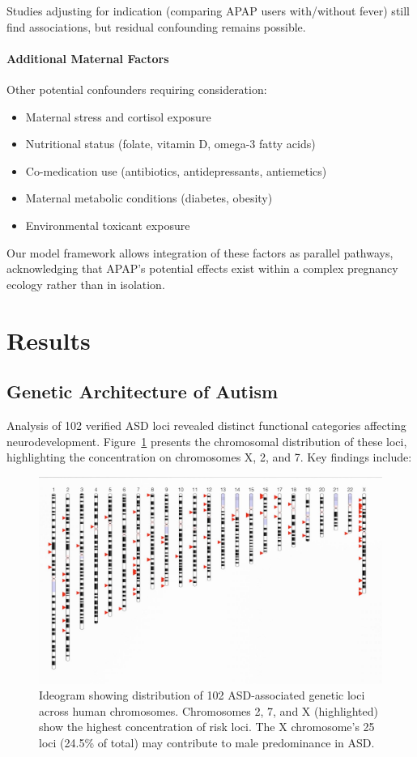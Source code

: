 \documentclass[11pt]{article}
\let\oldsection\section
\renewcommand{\section}[1]{\oldsection{#1}\setlength{\leftskip}{0em}}
\let\oldsubsection\subsection
\renewcommand{\subsection}[1]{\oldsubsection{#1}\setlength{\leftskip}{0.75em}}
\begin{document}
Studies adjusting for indication (comparing APAP users with/without fever) still find associations, but residual confounding remains possible.

\paragraph{Additional Maternal Factors}
Other potential confounders requiring consideration:
\begin{itemize}
\item Maternal stress and cortisol exposure
\item Nutritional status (folate, vitamin D, omega-3 fatty acids)
\item Co-medication use (antibiotics, antidepressants, antiemetics)
\item Maternal metabolic conditions (diabetes, obesity)
\item Environmental toxicant exposure
\end{itemize}

Our model framework allows integration of these factors as parallel pathways, acknowledging that APAP's potential effects exist within a complex pregnancy ecology rather than in isolation.

\section{Results}

\subsection{Genetic Architecture of Autism}
Analysis of 102 verified ASD loci revealed distinct functional categories affecting neurodevelopment. Figure~\ref{fig:ideogram} presents the chromosomal distribution of these loci, highlighting the concentration on chromosomes X, 2, and 7. Key findings include:

\begin{figure}[h]
\centering
\includegraphics[width=\textwidth]{../assets/Autism-Ideogram.jpg}
\caption{Ideogram showing distribution of 102 ASD-associated genetic loci across human chromosomes. Chromosomes 2, 7, and X (highlighted) show the highest concentration of risk loci. The X chromosome's 25 loci (24.5\% of total) may contribute to male predominance in ASD.}
\label{fig:ideogram}
\end{figure}
\end{document}
